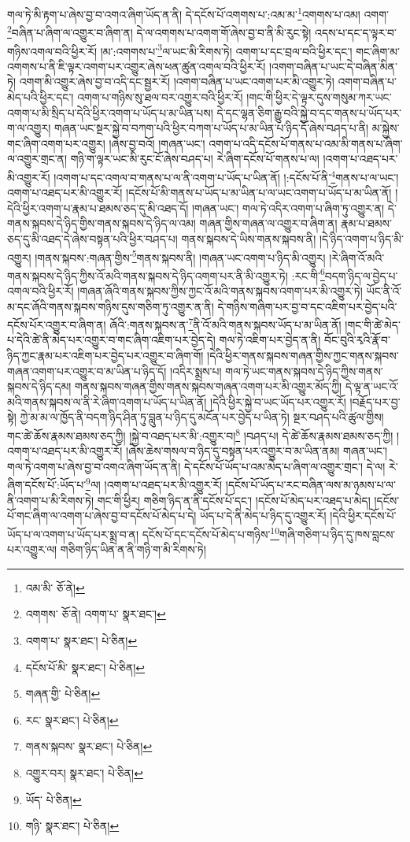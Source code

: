 གལ་ཏེ་མི་རྟག་པ་ཞེས་བྱ་བ་འགའ་ཞིག་ཡོད་ན་ནི། དེ་དངོས་པོ་འགགས་པ་:འམ་མ་\footnote{འམ་མི་  ཅོ་ནེ། }འགགས་པ་འམ། འགག་\footnote{འགགས་  ཅོ་ནེ། འགག་པ་  སྣར་ཐང་། }བཞིན་པ་ཞིག་ལ་འགྱུར་བ་ཞིག་ན། དེ་ལ་འགགས་པ་འགག་གོ་ཞེས་བྱ་བ་ནི་མི་རུང་སྟེ། འདས་པ་དང་ད་ལྟར་བ་གཉིས་འགལ་བའི་ཕྱིར་རོ། །མ་:འགགས་པ་\footnote{འགག་པ་  སྣར་ཐང་།  པེ་ཅིན། }ལ་ཡང་མི་རིགས་ཏེ། འགག་པ་དང་བྲལ་བའི་ཕྱིར་དང་། གང་ཞིག་མ་འགགས་པ་ནི་ཇི་ལྟར་འགག་པར་འགྱུར་ཞེས་ཕན་ཚུན་འགལ་བའི་ཕྱིར་རོ། །འགག་བཞིན་པ་ཡང་དེ་བཞིན་མིན་ཏེ། འགག་མི་འགྱུར་ཞེས་བྱ་བ་འདི་དང་སྦྱར་རོ། །འགག་བཞིན་པ་ཡང་འགག་པར་མི་འགྱུར་ཏེ། འགག་བཞིན་པ་མེད་པའི་ཕྱིར་དང་། འགག་པ་གཉིས་སུ་ཐལ་བར་འགྱུར་བའི་ཕྱིར་རོ། །གང་གི་ཕྱིར་དེ་ལྟར་དུས་གསུམ་ཀར་ཡང་འགག་པ་མི་སྲིད་པ་དེའི་ཕྱིར་འགག་པ་ཡོད་པ་མ་ཡིན་པས། དེ་དང་ལྷན་ཅིག་རྒྱུ་བའི་སྐྱེ་བ་དང་གནས་པ་ཡོད་པར་ག་ལ་འགྱུར། གཞན་ཡང་སྔར་སྐྱེ་བ་བཀག་པའི་ཕྱིར་བཀག་པ་ཡོད་པ་མ་ཡིན་པ་ཉིད་དོ་ཞེས་བཤད་པ་ནི། མ་སྐྱེས་གང་ཞིག་འགག་པར་འགྱུར། །ཞེས་བྱ་བའོ། །གཞན་ཡང་། འགག་པ་འདི་དངོས་པོ་གནས་པ་འམ་མི་གནས་པ་ཞིག་ལ་འགྱུར་གྲང་ན། གཉི་ག་ལྟར་ཡང་མི་རུང་ངོ་ཞེས་བཤད་པ། རེ་ཞིག་དངོས་པོ་གནས་པ་ལ། །འགག་པ་འཐད་པར་མི་འགྱུར་རོ། །འགག་པ་དང་འགལ་བ་གནས་པ་ལ་ནི་འགག་པ་ཡོད་པ་ཡིན་ནོ། །:དངོས་པོ་ནི་\footnote{དངོས་པོ་མི་  སྣར་ཐང་།  པེ་ཅིན། }གནས་པ་ལ་ཡང་། འགག་པ་འཐད་པར་མི་འགྱུར་རོ། །དངོས་པོ་མི་གནས་པ་ཡོད་པ་མ་ཡིན་པ་ལ་ཡང་འགག་པ་ཡོད་པ་མ་ཡིན་ནོ། །དེའི་ཕྱིར་འགག་པ་རྣམ་པ་ཐམས་ཅད་དུ་མི་འཐད་དོ། །གཞན་ཡང་། གལ་ཏེ་འདིར་འགག་པ་ཞིག་ཏུ་འགྱུར་ན། དེ་གནས་སྐབས་དེ་ཉིད་གྱིས་གནས་སྐབས་དེ་ཉིད་ལ་འམ། གཞན་གྱིས་གཞན་ལ་འགྱུར་བ་ཞིག་ན། རྣམ་པ་ཐམས་ཅད་དུ་མི་འཐད་དེ་ཞེས་བསྟན་པའི་ཕྱིར་བཤད་པ། གནས་སྐབས་དེ་ཡིས་གནས་སྐབས་ནི། །དེ་ཉིད་འགག་པ་ཉིད་མི་འགྱུར། །གནས་སྐབས་:གཞན་གྱིས་\footnote{གཞན་གྱི་  པེ་ཅིན། }གནས་སྐབས་ནི། །གཞན་ཡང་འགག་པ་ཉིད་མི་འགྱུར། །རེ་ཞིག་འོ་མའི་གནས་སྐབས་དེ་ཉིད་ཀྱིས་འོ་མའི་གནས་སྐབས་དེ་ཉིད་འགག་པར་ནི་མི་འགྱུར་ཏེ། :རང་གི་\footnote{རང་  སྣར་ཐང་།  པེ་ཅིན། }བདག་ཉིད་ལ་བྱེད་པ་འགལ་བའི་ཕྱིར་རོ། །གཞན་ཞོའི་གནས་སྐབས་ཀྱིས་ཀྱང་འོ་མའི་གནས་སྐབས་འགག་པར་མི་འགྱུར་ཏེ། ཡོང་ནི་འོ་མ་དང་ཞོའི་གནས་སྐབས་གཉིས་དུས་གཅིག་ཏུ་འགྱུར་ན་ནི། དེ་གཉིས་གཞིག་པར་བྱ་བ་དང་འཇིག་པར་བྱེད་པའི་དངོས་པོར་འགྱུར་བ་ཞིག་ན། ཞོའི་:གནས་སྐབས་ན་\footnote{གནས་སྐབས་  སྣར་ཐང་།  པེ་ཅིན། }ནི་འོ་མའི་གནས་སྐབས་ཡོད་པ་མ་ཡིན་ནོ། །གང་གི་ཚེ་མེད་པ་དེའི་ཚེ་ནི་མེད་པར་འགྱུར་བ་གང་ཞིག་འཇིག་པར་བྱེད་དེ། གལ་ཏེ་འཇིག་པར་བྱེད་ན་ནི། བོང་བུའི་རྭའི་རྣོ་བ་ཉིད་ཀྱང་རྣམ་པར་འཇིག་པར་བྱེད་པར་འགྱུར་བ་ཞིག་གོ། །དེའི་ཕྱིར་གནས་སྐབས་གཞན་གྱིས་ཀྱང་གནས་སྐབས་གཞན་འགག་པར་འགྱུར་བ་མ་ཡིན་པ་ཉིད་དོ། །འདིར་སྨྲས་པ། གལ་ཏེ་ཡང་གནས་སྐབས་དེ་ཉིད་ཀྱིས་གནས་སྐབས་དེ་ཉིད་དམ། གནས་སྐབས་གཞན་གྱིས་གནས་སྐབས་གཞན་འགག་པར་མི་འགྱུར་མོད་ཀྱི། དེ་ལྟ་ན་ཡང་འོ་མའི་གནས་སྐབས་ལ་ནི་རེ་ཞིག་འགག་པ་ཡོད་པ་ཡིན་ནོ། །དེའི་ཕྱིར་སྐྱེ་བ་ཡང་ཡོད་པར་འགྱུར་རོ། །བརྗོད་པར་བྱ་སྟེ། ཀྱེ་མ་མ་ལ་ཁྱོད་ནི་བདག་ཉིད་ཤིན་ཏུ་བླུན་པ་ཉིད་དུ་མངོན་པར་བྱེད་པ་ཡིན་ཏེ། སྔར་བཤད་པའི་ཚུལ་གྱིས། གང་ཚེ་ཆོས་རྣམས་ཐམས་ཅད་ཀྱི། །སྐྱེ་བ་འཐད་པར་མི་:འགྱུར་བ།\footnote{འགྱུར་བར།  སྣར་ཐང་།  པེ་ཅིན། } །བཤད་པ། དེ་ཚེ་ཆོས་རྣམས་ཐམས་ཅད་ཀྱི། །འགག་པ་འཐད་པར་མི་འགྱུར་རོ། །ཞེས་ཆེས་གསལ་བ་ཉིད་དུ་བསྟན་པར་འགྱུར་བ་མ་ཡིན་ནམ། གཞན་ཡང་། གལ་ཏེ་འགག་པ་ཞེས་བྱ་བ་འགའ་ཞིག་ཡོད་ན་ནི། དེ་དངོས་པོ་ཡོད་པ་འམ་མེད་པ་ཞིག་ལ་འགྱུར་གྲང་། དེ་ལ། རེ་ཞིག་དངོས་པོ་:ཡོད་པ་\footnote{ཡོད་  པེ་ཅིན། }ལ། །འགག་པ་འཐད་པར་མི་འགྱུར་རོ། །དངོས་པོ་ཡོད་པ་རང་བཞིན་ལས་མ་ཉམས་པ་ལ་ནི་འགག་པ་མི་རིགས་ཏེ། གང་གི་ཕྱིར། གཅིག་ཉིད་ན་ནི་དངོས་པོ་དང་། །དངོས་པོ་མེད་པར་འཐད་པ་མེད། །དངོས་པོ་གང་ཞིག་ལ་འགག་པ་ཞེས་བྱ་བ་དངོས་པོ་མེད་པ་དེ། ཡོད་པ་དེ་ནི་མེད་པ་ཉིད་དུ་འགྱུར་རོ། །དེའི་ཕྱིར་དངོས་པོ་ཡོད་པ་ལ་འགག་པ་ཡོད་པར་སྨྲ་བ་ན། དངོས་པོ་དང་དངོས་པོ་མེད་པ་གཉིས་\footnote{གཉི་  སྣར་ཐང་།  པེ་ཅིན། }གཞི་གཅིག་པ་ཉིད་དུ་ཁས་བླངས་པར་འགྱུར་ལ། གཅིག་ཉིད་ཡིན་ན་ནི་གཉི་ག་མི་རིགས་ཏེ། 